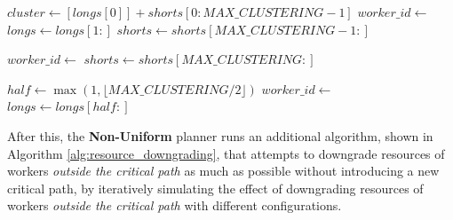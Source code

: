 \documentclass[conference]{IEEEtran}
\begin{document}
\begin{algorithm}
\begin{algorithmic}[1]
        \Statex
        \State {}
            \State $cluster \gets [longs[0]] + shorts[0:MAX\_CLUSTERING-1]$
            \State $worker\_id \gets$ 
            \State {}
            \State $longs \gets longs[1:]$
            \State $shorts \gets shorts[MAX\_CLUSTERING-1:]$
        \EndWhile
        
        \Statex
        \State {}
            \State $worker\_id \gets$ 
            \State {}
            \State $shorts \gets shorts[MAX\_CLUSTERING:]$
        \EndWhile
        
        \Statex
        \State {}
        \State $half \gets \max(1, \lfloor MAX\_CLUSTERING / 2 \rfloor)$
            \State $worker\_id \gets$ 
            \State {}
            \State $longs \gets longs[half:]$
        \EndWhile
    \EndFunction
\end{algorithmic}
\end{algorithm}

After this, the \textbf{Non-Uniform} planner runs an additional algorithm, shown in Algorithm \ref{alg:resource_downgrading}, that attempts to downgrade resources of workers \textit{outside the critical path} as much as possible without introducing a new critical path, by iteratively simulating the effect of downgrading resources of workers \textit{outside the critical path} with different configurations.
\end{document}
